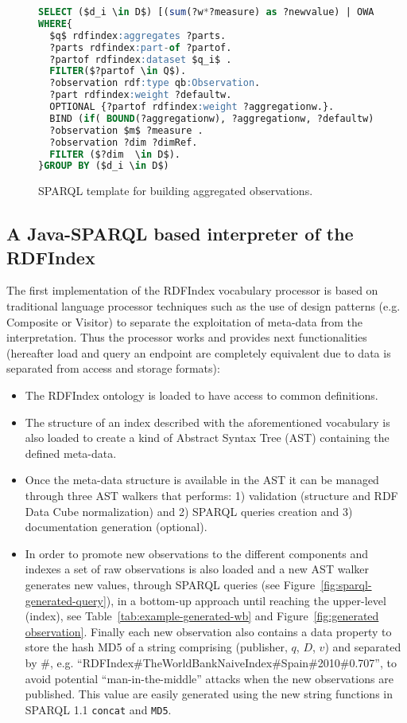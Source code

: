 \begin{figure}[!ht]
\begin{lstlisting}[language=SQL,mathescape]  
SELECT ($d_i \in D$) [(sum(?w*?measure) as ?newvalue) | OWA(?measure)]
WHERE{
  $q$ rdfindex:aggregates ?parts.
  ?parts rdfindex:part-of ?partof.
  ?partof rdfindex:dataset $q_i$ .
  FILTER($?partof \in Q$).  
  ?observation rdf:type qb:Observation.
  ?part rdfindex:weight ?defaultw.     
  OPTIONAL {?partof rdfindex:weight ?aggregationw.}.
  BIND (if( BOUND(?aggregationw), ?aggregationw, ?defaultw) AS ?w)
  ?observation $m$ ?measure . 
  ?observation ?dim ?dimRef. 
  FILTER ($?dim  \in D$).
}GROUP BY ($d_i \in D$)
\end{lstlisting}
\caption{SPARQL template for building aggregated observations.}
 \label{fig:results-rdf-sparql-template}
\end{figure}


\subsection{A Java-SPARQL based interpreter of the RDFIndex}
The first implementation of the RDFIndex vocabulary processor is based on traditional 
language processor techniques such as the use of design patterns (e.g. Composite or Visitor) 
to separate the exploitation of meta-data from the interpretation. Thus the processor 
works and provides next functionalities (hereafter load and query an endpoint are completely equivalent due to 
data is separated from access and storage formats):

\begin{itemize}
 \item The RDFIndex ontology is loaded to have access to common definitions.
 \item The structure of an index described with the aforementioned vocabulary is 
 also loaded to create a kind of Abstract Syntax Tree (AST) containing the defined meta-data.
 \item Once the meta-data structure is available in the AST it can be managed 
 through three AST walkers that performs: 1) validation (structure and RDF Data Cube normalization) 
 and 2) SPARQL queries creation and 3) documentation generation (optional). 
 \item In order to promote new observations to the different components and indexes 
 a set of raw observations is also loaded and a new AST walker generates new values, through SPARQL queries (see Figure~\ref{fig:sparql-generated-query}), 
 in a bottom-up approach until reaching the upper-level (index), see Table~\ref{tab:example-generated-wb} and Figure~\ref{fig:generated observation}. 
 Finally each new observation also contains a data property to store the hash MD5 of a string comprising 
 (publisher, $q$, $D$, $v$) and separated by \#, e.g. ``RDFIndex\#TheWorldBankNaiveIndex\#Spain\#2010\#0.707'', to avoid potential ``man-in-the-middle'' attacks when the new observations 
 are published. This value are easily generated using the new string functions in SPARQL 1.1 \texttt{concat} and \texttt{MD5}.
 \end{itemize}

